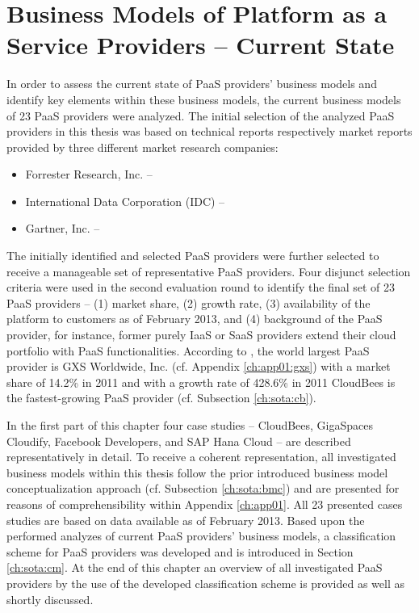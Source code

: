 \chapter{Business Models of Platform as a Service Providers -- Current State}\label{ch:sota}

In order to assess the current state of \ac{PaaS} providers' business models and identify key elements within these business models, the current business models of 23 \ac{PaaS} providers were analyzed. The initial selection of the analyzed \ac{PaaS} providers in this thesis was based on technical reports respectively market reports provided by three different market research companies:
\begin{itemize}[parsep=0pt, topsep=0pt, itemsep=0pt]
	\item Forrester Research, Inc. -- \citet{Rymer2011,Ried2011a}
	\item International Data Corporation (IDC) -- \citet{Bradshaw2012,Hendrick2012, Hendrick2012a}
	\item Gartner, Inc. -- \citet{Smith2012}
\end{itemize}
The initially identified and selected \ac{PaaS} providers were further selected to receive a manageable set of representative \ac{PaaS} providers. Four disjunct selection criteria were used in the second evaluation round to identify the final set of 23 \ac{PaaS} providers -- (1) market share, (2) growth rate, (3) availability of the platform to customers as of February 2013, and (4) background of the \ac{PaaS} provider, for instance, former purely \ac{IaaS} or \ac{SaaS} providers extend their cloud portfolio with \ac{PaaS} functionalities. According to \citet{Hendrick2012}, the world largest \ac{PaaS} provider is GXS Worldwide, Inc. (cf. Appendix \ref{ch:app01:gxs}) with a market share of 14.2\% in 2011 and with a growth rate of 428.6\% in 2011 CloudBees  is the fastest-growing \ac{PaaS} provider (cf. Subsection \ref{ch:sota:cb}).

In the first part of this chapter four case studies -- CloudBees, GigaSpaces Cloudify, Facebook Developers, and SAP Hana Cloud -- are described representatively in detail. To receive a coherent representation, all investigated business models within this thesis follow the prior introduced business model conceptualization approach (cf. Subsection \ref{ch:sota:bmc}) and are presented for reasons of comprehensibility within Appendix \ref{ch:app01}. All 23 presented cases studies are based on data available as of February 2013. Based upon the performed analyzes of current \ac{PaaS} providers' business models, a classification scheme for \ac{PaaS} providers was developed and is introduced in Section \ref{ch:sota:cm}. At the end of this chapter an overview of all investigated \ac{PaaS} providers by the use of the developed classification scheme is provided as well as shortly discussed.

